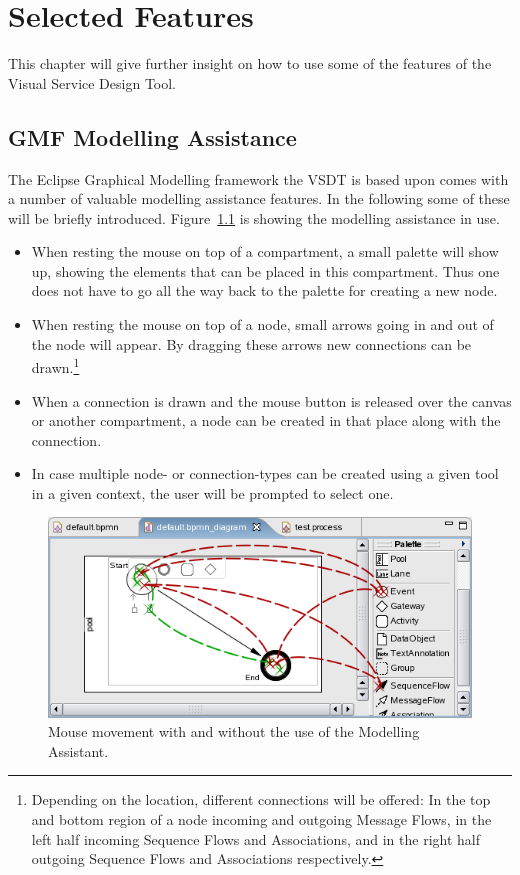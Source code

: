 \chapter{Selected Features}
\label{sec:user_features}

This chapter will give further insight on how to use some of the features of the Visual Service Design Tool.


\section{GMF Modelling Assistance}
\label{sec:user_features_assistance}

The Eclipse Graphical Modelling framework the VSDT is based upon comes with a number of valuable modelling assistance features. In the following some of these will be briefly introduced. Figure~\ref{fig:modAss} is showing the modelling assistance in use.

\begin{itemize}
	\item When resting the mouse on top of a compartment, a small palette will show up, showing the elements that can be placed in this compartment. Thus one does not have to go all the way back to the palette for creating a new node.
	\item When resting the mouse on top of a node, small arrows going in and out of the node will appear. By dragging these arrows new connections can be drawn.\footnote{Depending on the location, different connections will be offered: In the top and bottom region of a node incoming and outgoing Message Flows, in the left half incoming Sequence Flows and Associations, and in the right half outgoing Sequence Flows and Associations respectively.}
	\item When a connection is drawn and the mouse button is released over the canvas or another compartment, a node can be created in that place along with the connection.
	\item In case multiple node- or connection-types can be created using a given tool in a given context, the user will be prompted to select one.
\end{itemize}

\begin{figure}[ht]
	\centering
	\includegraphics[width=.5\textwidth]{figures/features/modellingAssistant.png}
	\caption{Mouse movement with and without the use of the Modelling Assistant.}
	\label{fig:modAss}
\end{figure}


